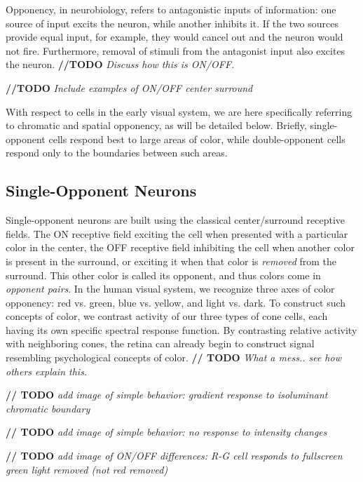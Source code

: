 \documentclass[journal,onecolumn]{IEEEtran}
\begin{document}
Opponency, in neurobiology, refers to antagonistic inputs of information: one source of input excits the neuron, while another inhibits it. If the two sources provide equal input, for example, they would cancel out and the neuron would not fire. 
Furthermore, removal of stimuli from the antagonist input also excites the neuron. \textbf{//TODO} \textit{Discuss how this is ON/OFF.}

\textbf{//TODO} \textit{Include examples of ON/OFF center surround}

With respect to cells in the early visual system, we are here specifically referring to chromatic and spatial opponency, as will be detailed below. Briefly, single-opponent cells respond best to large areas of color, while double-opponent cells respond only to the boundaries between such areas.


\subsection*{Single-Opponent Neurons}

Single-opponent neurons are built using the classical center/surround receptive fields. The ON receptive field exciting the cell when presented with a particular color in the center, the OFF receptive field inhibiting the cell when another color is present in the surround, or exciting it when that color is \textit{removed} from the surround. This other color is called its opponent, and thus colors come in \textit{opponent pairs}. In the human visual system, we recognize three axes of color opponency: red vs. green, blue vs. yellow, and light vs. dark. To construct such concepts of color, we contrast activity of our three types of cone cells, each having its own specific spectral response function. By contrasting relative activity with neighboring cones, the retina can already begin to construct signal resembling psychological concepts of color. \textbf{// TODO} \textit{What a mess.. see how others explain this.}

\textbf{// TODO} \textit{add image of simple behavior: gradient response to isoluminant chromatic boundary}

\textbf{// TODO} \textit{add image of simple behavior: no response to intensity changes}

\textbf{// TODO} \textit{add image of ON/OFF differences: R-G cell responds to fullscreen green light removed (not red removed)}
\end{document}
